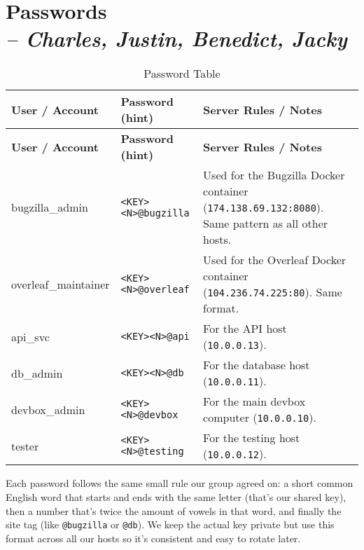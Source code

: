 \chapter[Passwords]{Passwords\\\small{\textit{-- Charles, Justin, Benedict, Jacky}}}
\label{Chapter::Passwords}

\begin{longtable}{|p{2.8cm}||p{4.5cm}||p{8cm}|}
\caption{Password Table \label{Table::PasswordTable}}\\
\hline
\textbf{User / Account} & \textbf{Password (hint)} & \textbf{Server Rules / Notes} \\
\hline
\endfirsthead
\hline
\textbf{User / Account} & \textbf{Password (hint)} & \textbf{Server Rules / Notes} \\
\hline
\endhead

bugzilla\_admin & \texttt{<KEY><N>@bugzilla} & Used for the Bugzilla Docker container \newline (\texttt{174.138.69.132:8080}). Same pattern as all other hosts. \\
\hline

overleaf\_maintainer & \texttt{<KEY><N>@overleaf} & Used for the Overleaf Docker container \newline (\texttt{104.236.74.225:80}). Same format. \\
\hline

api\_svc & \texttt{<KEY><N>@api} & For the API host \newline (\texttt{10.0.0.13}). \\
\hline

db\_admin & \texttt{<KEY><N>@db} & For the database host \newline (\texttt{10.0.0.11}). \\
\hline

devbox\_admin & \texttt{<KEY><N>@devbox} & For the main devbox computer \newline (\texttt{10.0.0.10}). \\
\hline

tester & \texttt{<KEY><N>@testing} & For the testing host \newline (\texttt{10.0.0.12}). \\
\hline

\end{longtable}

\noindent
Each password follows the same small rule our group agreed on:  
a short common English word that starts and ends with the same letter (that’s our shared key),  
then a number that’s twice the amount of vowels in that word,  
and finally the site tag (like \texttt{@bugzilla} or \texttt{@db}).  
We keep the actual key private but use this format across all our hosts so it’s consistent and easy to rotate later.
